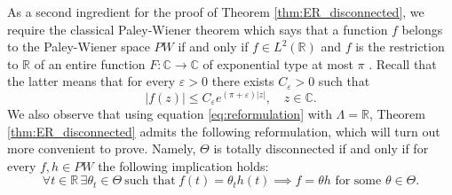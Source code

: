 \documentclass[reqno,a4paper,11pt]{amsart}
\numberwithin{equation}{section}
\def\R{{\mathbb R}}
\def\C{{\mathbb C}}
\newcommand{\lt}{{L^2(\R)}}
\newcommand\1{\mathds{1}}
\begin{document}
As a second ingredient for the proof of Theorem \ref{thm:ER_disconnected}, we require the classical Paley-Wiener theorem which says that a function $f$ belongs to the Paley-Wiener space $PW$ if and only if $f \in \lt$ and $f$ is the restriction to $\R$ of an entire function $F : \C \to \C$ of exponential type at most $\pi$ \cite{Young}. Recall that the latter means that for every $\varepsilon>0$ there exists $C_\varepsilon>0$ such that
\begin{equation}\label{eq:exp_type}
    |f(z)| \leq C_\varepsilon e^{(\pi+\varepsilon)|z|}, \quad z \in \C.
\end{equation}
We also observe that using equation \eqref{eq:reformulation} with $\Lambda = \R$, Theorem \ref{thm:ER_disconnected} admits the following reformulation, which will turn out more convenient to prove. Namely, $\Theta$ is totally disconnected if and only if for every $f,h \in PW$ the following implication holds:
\begin{equation}\label{eq:pw_line_impl}
    \forall t \in \R \, \exists \theta_t \in \Theta \ \text{such that} \ f(t) = \theta_t h(t) \implies f=\theta h \text{ for some } \theta\in\Theta.
\end{equation}
\end{document}

